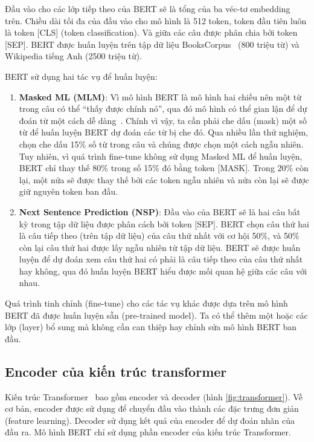 
Đầu vào cho các lớp tiếp theo của BERT sẽ là tổng của ba véc-tơ embedding trên.  Chiều dài tối đa của đầu vào cho mô hình là 512 token, token đầu tiên luôn là token [CLS] (token classification). Và giữa các câu được phân chia bởi token [SEP]. BERT được huấn luyện trên tập dữ liệu BooksCorpus~\cite{zhuAligningBooksMovies2015} (800 triệu từ) và Wikipedia tiếng Anh (2500 triệu từ).

BERT sử dụng hai tác vụ để huấn luyện:

\begin{enumerate}
	\item \textbf{Masked ML (MLM)}: Vì mô hình BERT là mô hình hai chiều nên một từ trong câu có thể ``thấy được chính nó'', qua đó mô hình có thể gian lận để dự đoán từ một cách dễ dàng~\cite{devlinBERTPretrainingDeep2019}. Chính vì vậy, ta cần phải che dấu (mask) một số từ để huấn luyện BERT dự đoán các từ bị che đó.  Qua nhiều lần thử nghiệm, \cite{devlinBERTPretrainingDeep2019} chọn che dấu 15\% số từ trong câu và chúng được chọn một cách ngẫu nhiên. Tuy nhiên, vì quá trình fine-tune không sử dụng Masked ML để huấn luyện, BERT chỉ thay thế 80\% trong số 15\% đó bằng token [MASK]. Trong 20\% còn lại, một nửa sẽ được thay thế bởi các token ngẫu nhiên và nửa còn lại sẽ được giữ nguyên token ban đầu.
	\item \textbf{Next Sentence Prediction (NSP)}: Đầu vào của BERT sẽ là hai câu bất kỳ trong tập dữ liệu được phân cách bởi token [SEP]. BERT chọn câu thứ hai là câu tiếp theo (trên tập dữ liệu) của câu thứ nhất với cơ hội 50\%, và 50\% còn lại câu thứ hai được lấy ngẫu nhiên từ tập dữ liệu. BERT sẽ được huấn luyện để dự đoán xem câu thứ hai có phải là câu tiếp theo của câu thứ nhất hay không, qua đó huấn luyện BERT hiểu được mối quan hệ giữa các câu với nhau.
\end{enumerate}

Quá trình tinh chỉnh (fine-tune) cho các tác vụ khác được dựa trên mô hình BERT đã được huấn luyện sẵn (pre-trained model). Ta có thể thêm một hoặc các lớp (layer) bổ sung mà không cần can thiệp hay chỉnh sửa mô hình BERT ban đầu.

\subsection{Encoder của kiến trúc transformer} Kiến trúc
Transformer~\cite{vaswaniAttentionAllYou2017} bao gồm encoder và decoder (hình \ref{fig:transformer}). Về cơ bản, encoder được sử dụng để chuyển đầu vào thành các đặc trưng đơn giản (feature learning). Decoder sử dụng kết quả của encoder để dự đoán nhãn của đầu ra. Mô hình BERT chỉ sử dụng phần encoder của kiến trúc Transformer.

